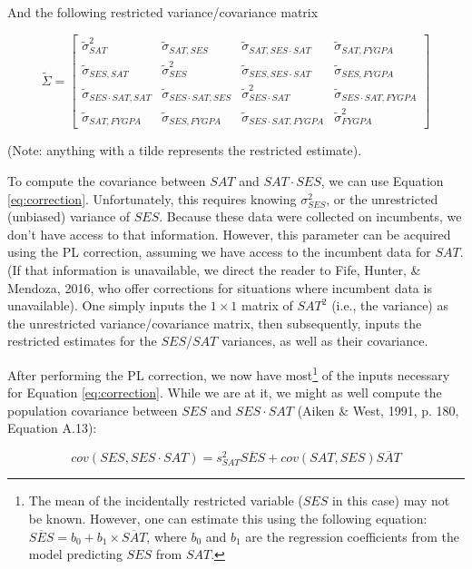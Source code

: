 \documentclass[english,man]{apa6}
\theoremstyle{definition}
\theoremstyle{definition}
\theoremstyle{remark}
\begin{document}
And the following restricted variance/covariance matrix

\[
   \widetilde{\Sigma}=
  \left[ {\begin{array}{cccc}
   \tilde{\sigma}^2_{SAT} & \tilde{\sigma}_{SAT,{SES}} & \tilde{\sigma}_{SAT,SES\cdot SAT} & \tilde{\sigma}_{SAT, FYGPA}\\
    \tilde{\sigma}_{SES,SAT} & \tilde{\sigma}^2_{SES} & \tilde{\sigma}_{SES,SES\cdot SAT} & \tilde{\sigma}_{SES, FYGPA} \\
    \tilde{\sigma}_{SES\cdot SAT,SAT} &\tilde{\sigma}_{SES\cdot SAT,SES} & \tilde{\sigma}^2_{SES\cdot SAT} & \tilde{\sigma}_{SES\cdot SAT, FYGPA} \\
     \tilde{\sigma}_{SAT, FYGPA} & \tilde{\sigma}_{SES, FYGPA} & \tilde{\sigma}_{SES\cdot SAT, FYGPA} & \tilde{\sigma}^2_{FYGPA}
  \end{array} } \right]
\]

\noindent (Note: anything with a tilde represents the restricted
estimate).

To compute the covariance between \(SAT\) and \(SAT\cdot SES\), we can
use Equation \ref{eq:correction}. Unfortunately, this requires knowing
\(\sigma_{SES}^2\), or the unrestricted (unbiased) variance of \(SES\).
Because these data were collected on incumbents, we don't have access to
that information. However, this parameter can be acquired using the PL
correction, assuming we have access to the incumbent data for \(SAT\).
(If that information is unavailable, we direct the reader to Fife,
Hunter, \& Mendoza, 2016, who offer corrections for situations where
incumbent data is unavailable). One simply inputs the \(1\times1\)
matrix of \(SAT^2\) (i.e., the variance) as the unrestricted
variance/covariance matrix, then subsequently, inputs the restricted
estimates for the \(SES\)/\(SAT\) variances, as well as their
covariance.

After performing the PL correction, we now have most\footnote{The mean
  of the incidentally restricted variable (\(SES\) in this case) may not
  be known. However, one can estimate this using the following equation:
  \(\overline{SES} = b_0 + b_1\times \overline{SAT}\), where \(b_0\) and
  \(b_1\) are the regression coefficients from the model predicting
  \(SES\) from \(SAT\).} of the inputs necessary for Equation
\ref{eq:correction}. While we are at it, we might as well compute the
population covariance between \(SES\) and \(SES \cdot SAT\) (Aiken \&
West, 1991, p. 180, Equation A.13):

\begin{equation}
cov(SES, SES\cdot SAT) = s^2_{SAT} \overline{SES} + cov(SAT, SES) \overline{SAT}
\label{eq:correction2}
\end{equation}
\end{document}
